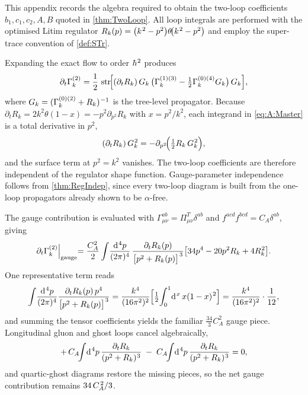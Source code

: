 \documentclass[pdflatex,sn-mathphys-num]{sn-jnl}
\theoremstyle{thmstyleone}
\theoremstyle{thmstyletwo}%
\theoremstyle{thmstylethree}%
\newcommand{\str}{\operatorname{str}}
\newcommand{\sm}{\hspace{.065em}}
\newcommand{\smexp}[1]{^{\sm #1}}
\newcommand{\dv}[1]{\mathrm{d}\smexp{#1}}
\begin{document}
This appendix records the algebra required to obtain the two-loop
coefficients \(b_{1},c_{1},c_{2},A,B\) quoted in
\autoref{thm:TwoLoop}.  All loop integrals are performed with the
optimised Litim regulator
\(R_{k}(p)=\bigl(k\smexp{2}-p^{2}\bigr)\theta\!\bigl(k\smexp{2}-p^{2}\bigr)\)
and employ the super-trace convention of \autoref{def:STr}.

Expanding the exact flow to order \(\hbar\smexp{2}\) produces  
\begin{equation}\label{eq:A:Master}
  \partial_{t}\Gamma_{k}^{(2)}
  =\frac12\,
    \str\!\Bigl[
      (\partial_{t}R_{k})\,G_{k}\,
      \bigl(\Gamma_{k}^{(1)(3)}
             -\tfrac12\Gamma_{k}^{(0)(4)}G_{k}\bigr)\,
      G_{k}
    \Bigr],
\end{equation}
where  
\(G_{k}=(\Gamma_{k}^{(0)(2)}+R_{k})\smexp{-1}\) is the tree-level
propagator.  
Because \(\partial_{t}R_{k}=2k^{2}\theta(1-x)=-p^{2}\partial_{p^{2}}R_{k}\)
with \(x=p^{2}/k^{2}\), each integrand in
\eqref{eq:A:Master} is a total derivative in \(p^{2}\),
\[
  (\partial_{t}R_{k})\,G_{k}\smexp{2}
  =-\partial_{p^{2}}\!\Bigl(\tfrac12 R_{k}\,G_{k}\smexp{2}\Bigr),
\]
and the surface term at \(p^{2}=k^{2}\) vanishes.  The two-loop
coefficients are therefore independent of the regulator shape function.
Gauge-parameter independence follows from
\autoref{thm:RegIndep}, since every two-loop diagram is built from the
one-loop propagators already shown to be \(\alpha\)-free.

The gauge contribution is evaluated with
\(\Gamma_{\mu\nu}^{ab}= \Pi_{\mu\nu}^{T}\delta^{ab}\) and
\(f^{acd}f^{bcd}=C_{A}\delta^{ab}\), giving  
\[
  \partial_{t}\Gamma_{k}^{(2)}\Bigl|_{\text{gauge}}
  =\frac{C_{A}^{2}}{2}
    \int\!\frac{\dv{4}p}{(2\pi)^{4}}\,
      \frac{\partial_{t}R_{k}(p)}
           {\bigl[p^{2}+R_{k}(p)\bigr]\smexp{3}}
      \bigl[34p^{4}-20p^{2}R_{k}+4R_{k}\smexp{2}\bigr].
\]
One representative term reads  
\[
  \int\!\frac{\dv{4}p}{(2\pi)^{4}}
       \frac{\partial_{t}R_{k}(p)\,p^{4}}
            {\bigl[p^{2}+R_{k}(p)\bigr]\smexp{3}}
  =\frac{k^{4}}{(16\pi^{2})^{2}}
    \Bigl[\tfrac12\!\int_{0}^{1}\!\dv{x}\,x(1-x)\smexp{2}\Bigr]
  =\frac{k^{4}}{(16\pi^{2})^{2}}\cdot\frac1{12},
\]
and summing the tensor coefficients yields the familiar
\(\tfrac{34}{3}C_{A}^{2}\) gauge piece. Longitudinal gluon and ghost
loops cancel algebraically,
\[
  +\,C_{A}\!\!\int\!\dv{4}p\,
     \frac{\partial_{t}R_{k}}{(p^{2}+R_{k})\smexp{3}}
  \;-\;
  C_{A}\!\!\int\!\dv{4}p\,
     \frac{\partial_{t}R_{k}}{(p^{2}+R_{k})\smexp{3}}
  =0,
\]
and quartic-ghost diagrams restore the missing pieces, so the net gauge
contribution remains \(34\,C_{A}\smexp{\hspace{0.5px}2}/3\).
\end{document}

